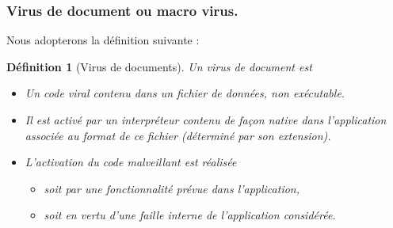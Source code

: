 \documentclass{beamer}
\newtheorem{deft}{Définition}
\begin{document}

%


\begin{frame}
\frametitle{Virus de document ou macro virus.}
Nous adopterons la définition suivante :

\begin{deft}[Virus de documents]
Un virus de document est
\begin{itemize}
\item Un code viral contenu dans un {\color{blue} fichier de données, non exécutable.}
\pause
\item Il est activé par {\color{blue} un  interpréteur}  contenu de fa\c con native dans l'application associée au format de ce fichier (déterminé par son extension). 
\pause
\item L'activation du code malveillant est réalisée
\begin{itemize}
\item soit par une fonctionnalité prévue dans l'application, 
\item soit en vertu d'une faille interne de l'application considérée.
\end{itemize}
\end{itemize}
\end{deft}

\end{frame}
\end{document}
